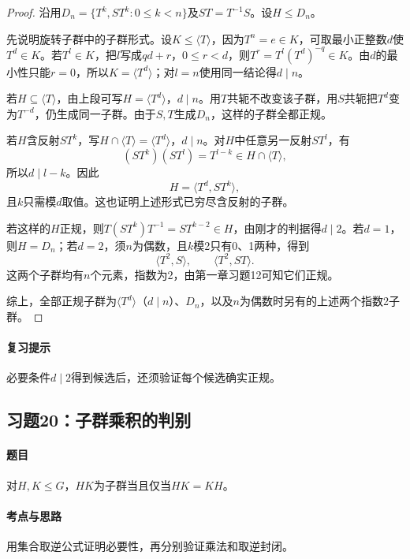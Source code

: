 \begin{proof}
沿用$D_n=\{T^k,ST^k:0\leq k<n\}$及$ST=T^{-1}S$。设$H\leq D_n$。

先说明旋转子群中的子群形式。设$K\leq\langle T\rangle$，因为$T^n=e\in K$，可取最小正整数$d$使$T^d\in K$。若$T^l\in K$，把$l$写成$qd+r$，$0\leq r<d$，则$T^r=T^l(T^d)^{-q}\in K$。由$d$的最小性只能$r=0$，所以$K=\langle T^d\rangle$；对$l=n$使用同一结论得$d\mid n$。

若$H\subseteq\langle T\rangle$，由上段可写$H=\langle T^d\rangle$，$d\mid n$。用$T$共轭不改变该子群，用$S$共轭把$T^d$变为$T^{-d}$，仍生成同一子群。由于$S,T$生成$D_n$，这样的子群全都正规。

若$H$含反射$ST^k$，写$H\cap\langle T\rangle=\langle T^d\rangle$，$d\mid n$。对$H$中任意另一反射$ST^l$，有
\[
(ST^k)(ST^l)=T^{l-k}\in H\cap\langle T\rangle,
\]
所以$d\mid l-k$。因此
\[
H=\langle T^d,ST^k\rangle,
\]
且$k$只需模$d$取值。这也证明上述形式已穷尽含反射的子群。

若这样的$H$正规，则$T(ST^k)T^{-1}=ST^{k-2}\in H$，由刚才的判据得$d\mid2$。若$d=1$，则$H=D_n$；若$d=2$，须$n$为偶数，且$k$模2只有0、1两种，得到
\[
\langle T^2,S\rangle,\qquad\langle T^2,ST\rangle.
\]
这两个子群均有$n$个元素，指数为2，由第一章习题12可知它们正规。

综上，全部正规子群为$\langle T^d\rangle$（$d\mid n$）、$D_n$，以及$n$为偶数时另有的上述两个指数2子群。
\end{proof}

\paragraph{复习提示}
必要条件$d\mid2$得到候选后，还须验证每个候选确实正规。


\subsection{习题20：\texorpdfstring{子群乘积的判别}{子群乘积的判别}}
\label{ex:1:20}

\paragraph{题目}
对$H,K\leq G$，$HK$为子群当且仅当$HK=KH$。

\paragraph{考点与思路}
用集合取逆公式证明必要性，再分别验证乘法和取逆封闭。

